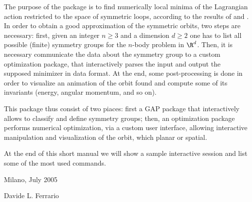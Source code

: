 
The purpose of the package is to find numerically  
local minima of the Lagrangian action restricted 
to the space of symmetric loops, according to the results 
of 
\cite{FT2003} and \cite{zz}.
In order to obtain a good approximation of the symmetric orbits,
two steps  are necessary:
first, given an integer $n\geq 3$ and a dimension $d\geq 2$
one has to list all possible (finite) symmetry groups
for the $n$-body problem in $\R^d$.
Then, it is necessary communicate the data about the symmetry
group to a custom optimization package, that interactively
parses the input and output the supposed minimizer
in data format. At the end, some post-processing is done in
order to visualize an animation of the orbit found
and compute some of its invariants (energy, angular momentum,
and so on).

This package thus consist of two piaces:
first a GAP package that interactively allows to classify
and define symmetry groups; then, an optimization package
performs numerical optimization, via a custom user interface,
allowing interactive manipulation and visualization of 
the orbit, which planar or spatial.

At the end of this short manual we will show a sample
interactive session and list some of the most used commands.


\vskip 3cm

\hfill Milano, July 2005

\hfill Davide L. Ferrario



